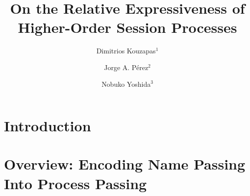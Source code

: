 \documentclass[runningheads]{llncs}
\begin{document}



\title{On the Relative Expressiveness of\\ 
Higher-Order Session Processes
}

\author{
	Dimitrios Kouzapas$^1$%
	\and
	Jorge A. P\'{e}rez$^2$
	\and Nobuko Yoshida$^3$
}
\maketitle









%

%

\section{Introduction}
\label{sec:intro}
%


\section{Overview: Encoding Name Passing Into Process Passing} %
\label{sec:overview}

\end{document}

